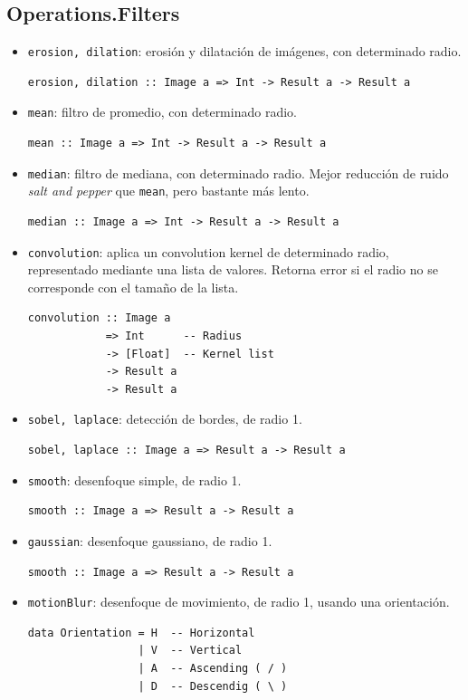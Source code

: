 \documentclass[a4paper, 11pt]{article} %
\begin{document}
\subsection*{Operations.Filters}
	\begin{itemize} 
		\item \texttt{erosion, dilation}: erosión y dilatación de imágenes, con determinado radio.
\begin{lstlisting}
erosion, dilation :: Image a => Int -> Result a -> Result a
\end{lstlisting}
		\item \texttt{mean}: filtro de promedio, con determinado radio.
\begin{lstlisting}
mean :: Image a => Int -> Result a -> Result a
\end{lstlisting}
		\item \texttt{median}: filtro de mediana, con determinado radio. Mejor reducción de ruido \textit{salt and pepper} que \texttt{mean}, pero bastante más lento. 
\begin{lstlisting}
median :: Image a => Int -> Result a -> Result a
\end{lstlisting}
		\item \texttt{convolution}: aplica un convolution kernel de determinado radio, representado mediante una lista de valores. Retorna error si el radio no se corresponde con el tamaño de la lista.
\begin{lstlisting}
convolution :: Image a 
            => Int      -- Radius
            -> [Float]  -- Kernel list
            -> Result a 
            -> Result a
\end{lstlisting}
		\item \texttt{sobel, laplace}: detección de bordes, de radio 1.
\begin{lstlisting}
sobel, laplace :: Image a => Result a -> Result a
\end{lstlisting}
		\item \texttt{smooth}: desenfoque simple, de radio 1.
\begin{lstlisting}
smooth :: Image a => Result a -> Result a
\end{lstlisting}
		\item \texttt{gaussian}: desenfoque gaussiano, de radio 1.
\begin{lstlisting}
smooth :: Image a => Result a -> Result a
\end{lstlisting}
		\item \texttt{motionBlur}: desenfoque de movimiento, de radio 1, usando una orientación. 
\begin{lstlisting}
data Orientation = H  -- Horizontal
                 | V  -- Vertical
                 | A  -- Ascending ( / )
                 | D  -- Descendig ( \ )


\end{lstlisting}
\end{itemize}
\end{document}
